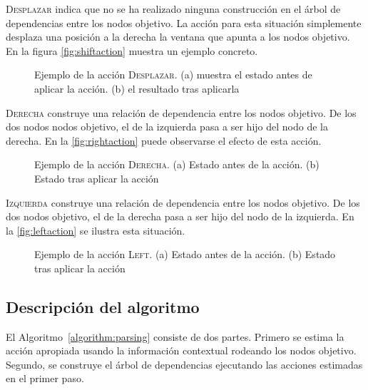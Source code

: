 \textsc{Desplazar} indica que no se ha realizado ninguna construcción en el
árbol de dependencias entre los nodos objetivo. La acción para esta situación
simplemente desplaza una posición a la derecha la ventana que apunta a los nodos
objetivo. En la figura \autoref{fig:shiftaction} muestra un ejemplo concreto.

\begin{figure}[ht]
  \caption{Ejemplo de la acción \textsc{Desplazar}. (a) muestra el estado antes
    de aplicar la acción. (b) el resultado tras aplicarla}
  \label{fig:shiftaction}
\end{figure}

\textsc{Derecha} construye una relación de dependencia entre los nodos
objetivo. De los dos nodos nodos objetivo, el de la izquierda pasa a ser hijo
del nodo de la derecha. En la \autoref{fig:rightaction} puede observarse el
efecto de esta acción.

\begin{figure}[ht]
  \caption{Ejemplo de la acción \textsc{Derecha}. (a) Estado antes de la
    acción. (b) Estado tras aplicar la acción}
  \label{fig:rightaction}
\end{figure}

\textsc{Izquierda} construye una relación de dependencia entre los nodos
objetivo. De los dos nodos objetivo, el de la derecha pasa a ser hijo del nodo
de la izquierda. En la \autoref{fig:leftaction} se ilustra esta situación.

\begin{figure}[ht]
  \caption{Ejemplo de la acción \textsc{Left}. (a) Estado antes de la
    acción. (b) Estado tras aplicar la acción}
  \label{fig:leftaction}
\end{figure}

\subsection{Descripción del algoritmo}
\label{subsec:algdesc}

El Algoritmo~\autoref{algorithm:parsing} consiste de dos partes. Primero se
estima la acción apropiada usando la información contextual rodeando los nodos
objetivo. Segundo, se construye el árbol de dependencias ejecutando las acciones
estimadas en el primer paso.

